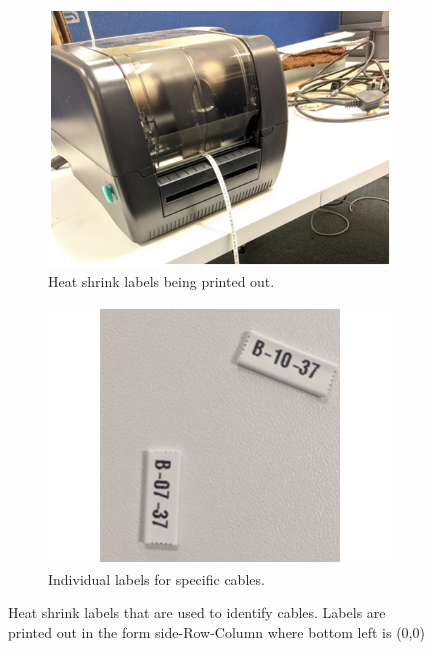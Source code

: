 \begin{figure}[htbp]
\centering
\begin{subfigure}{.5\textwidth}
  \centering
  \includegraphics[width=\linewidth]{Chapter3/Figs/Raster/detCon018b_HeatLabelsPrinted.png}
  \captionsetup{width=.9\linewidth}
  \caption{Heat shrink labels being printed out.}
  \label{subFig:detCon018b_HeatLabelsPrinted}
\end{subfigure}%
\begin{subfigure}{.5\textwidth}
  \centering
  \includegraphics[width=\linewidth]{Chapter3/Figs/Raster/detCon019b_CutLabels.png}
  \captionsetup{width=.9\linewidth}
  \caption{Individual labels for specific cables.}
  \label{subFig:detCon019b_CutLabels}
\end{subfigure}
\caption{Heat shrink labels that are used to identify cables. Labels are printed out in the form side-Row-Column where bottom left is (0,0) }
\label{fig:detCon_HeatLabelsPrinted_CutLabels}
\end{figure}

